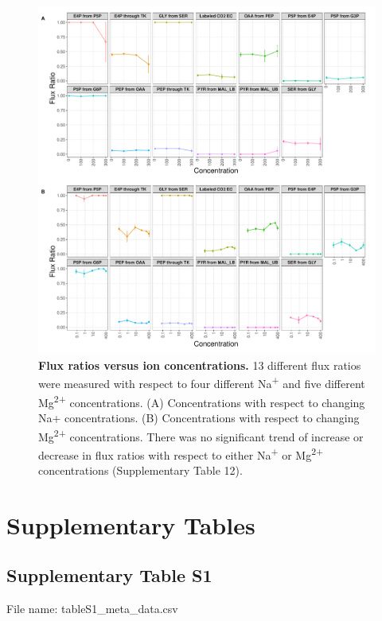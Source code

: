 \documentclass[a4paper]{article}
\begin{document}
\clearpage
\begin{figure}[!htb]
	\includegraphics[width=1\textwidth]{../../e_figures/Exp.pdf}
	\caption[Flux ratios versus ion concentrations]
	{\textbf{Flux ratios versus ion concentrations.} 13 different flux ratios were measured with respect to four different Na\textsuperscript{+} and five different Mg\textsuperscript{2+} concentrations. (A) Concentrations with respect to changing Na+ concentrations. (B) Concentrations with respect to changing Mg\textsuperscript{2+} concentrations. There was no significant trend of increase or decrease in flux ratios with respect to either Na\textsuperscript{+} or Mg\textsuperscript{2+} concentrations (Supplementary Table 12).}
\end{figure}




\clearpage

\section*{Supplementary Tables}

\subsection*{Supplementary Table S1}
File name: tableS1\_meta\_data.csv
\end{document}
